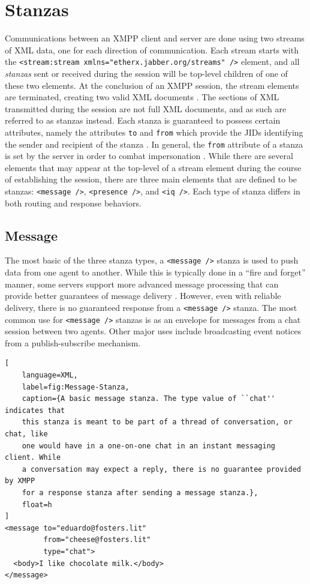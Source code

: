 \section{Stanzas}
\label{sec:Stanzas}

Communications between an XMPP client and server are done using two streams of
XML data, one for each direction of communication. Each stream starts with the
\texttt{<stream:stream xmlns="etherx.jabber.org/streams" />} element, and all
\textit{stanzas} sent or received during the session will be top-level children
of one of these two elements. At the conclusion of an XMPP session, the stream
elements are terminated, creating two valid XML documents \cite{RFC3920}. The
sections of XML transmitted during the session are not full XML documents,
and as such are referred to as stanzas instead. Each stanza is guaranteed to
possess certain attributes, namely the attributes \texttt{to} and \texttt{from}
which provide the JIDs identifying the sender and recipient of the stanza
\cite{RFC3920}. In general, the \texttt{from} attribute of a stanza is set by
the server in order to combat impersonation \cite{RFC3920}. While
there are several elements that may appear at the top-level of a stream element
during the course of establishing the session, there are three main elements
that are defined to be stanzas: \texttt{<message />}, \texttt{<presence />},
and \texttt{<iq />}. Each type of stanza differs in both routing and response
behaviors.

\subsection{Message}
\label{sec:Message}

The most basic of the three stanza types, a \texttt{<message />} stanza is used
to push data from one agent to another. While this is typically done in a ``fire
and forget'' manner, some servers support more advanced message processing that
can provide better guarantees of message delivery \cite{XEP-0079}. However, even
with reliable delivery, there is no guaranteed response from a \texttt{<message
/>} stanza. The most common use for \texttt{<message />} stanzas is as an
envelope for messages from a chat session between two agents. Other major uses
include broadcasting event notices from a publish-subscribe mechanism.

\begin{lstlisting}[
    language=XML,
    label=fig:Message-Stanza,
    caption={A basic message stanza. The type value of ``chat'' indicates that
    this stanza is meant to be part of a thread of conversation, or chat, like
    one would have in a one-on-one chat in an instant messaging client. While
    a conversation may expect a reply, there is no guarantee provided by XMPP
    for a response stanza after sending a message stanza.},
    float=h
]
<message to="eduardo@fosters.lit" 
         from="cheese@fosters.lit" 
         type="chat">
  <body>I like chocolate milk.</body>
</message>
\end{lstlisting}


